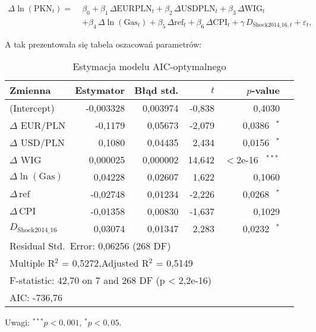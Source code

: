 \documentclass[12pt, twoside]{article}
\begin{document}
\begin{equation}
\begin{split}
\Delta \ln(\text{PKN}_{t}) =\;& \beta_{0}
+ \beta_{1}\,\Delta \text{EURPLN}_{t}
+ \beta_{2}\,\Delta \text{USDPLN}_{t}
+ \beta_{3}\,\Delta \text{WIG}_{t}\\[6pt]
&+ \beta_{4}\,\Delta \ln(\text{Gas}_{t})
+ \beta_{5}\,\Delta \text{ref}_{t}
+ \beta_{6}\,\Delta \text{CPI}_{t}
+ \gamma\,D_{\text{Shock2014\_16},t}
+ \varepsilon_{t},
\end{split}
\label{eq:aic_model}
\end{equation}



\newpage
A tak prezentowała się tabela oszacowań parametrów:
\begin{table}[ht]
  \centering
  \caption{Estymacja modelu AIC-optymalnego}
  \label{tab:aic_model}
  \begin{tabular}{lrrrrr}
    \toprule
    Zmienna & Estymator & Błąd std. & $t$ & $p$-value & \\
    \midrule
    (Intercept)               & -0,003328 & 0,003974 & -0,838  & 0,4030 & \\
    $\Delta$ EUR/PLN         & -0,1179   & 0,05673  & -2,079  & 0,0386$^{\quad*}$  & \\
    $\Delta$ USD/PLN         &  0,1080   & 0,04435  &  2,434  & 0,0156$^{\quad*}$  & \\
    $\Delta$ WIG             &  0,000025 & 0,000002 & 14,642  & $<$2e-16$^{\quad***}$ & \\
    $\Delta\ln(\mathrm{Gas})$ & 0,04228  & 0,02607  & 1,622   & 0,1060       & \\
    $\Delta\,\mathrm{ref}$      & -0,02748 & 0,01234  & -2,226  & 0,0268$^{\quad*}$  & \\
    $\Delta\,\mathrm{CPI}$      & -0,01358 & 0,00830  & -1,637  & 0,1029       & \\
    $D_{\mathrm{Shock2014\_16}}$ & 0,03074  & 0,01347  & 2,283   & 0,0232$^{\quad*}$  & \\
    \midrule
    \multicolumn{6}{l}{Residual Std.\ Error: 0,06256 (268 DF)} \\
    \multicolumn{6}{l}{Multiple R$^2$ = 0,5272,\quad Adjusted R$^2$ = 0,5149} \\
    \multicolumn{6}{l}{F-statistic: 42,70 on 7 and 268 DF (p < 2,2e-16)} \\
    \multicolumn{6}{l}{AIC: -736,76} \\
    \bottomrule
  \end{tabular}
  \begin{tablenotes}
    \small
    \item Uwagi: $^{***}p<0{,}001$, $^{*}p<0{,}05$.
  \end{tablenotes}
\end{table}
\end{document}
